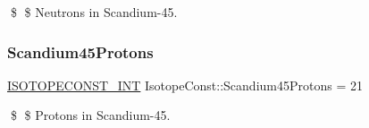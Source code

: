 \$ \$ Neutrons in Scandium-\/45. \mbox{\label{group___isotope_const-_scandium-_sc45_ga2f03bbc348934fbb65cb8064552cea9f}} 
\subsubsection{\texorpdfstring{Scandium45\+Protons}{Scandium45Protons}}
{\footnotesize\ttfamily \mbox{\hyperlink{group___isotope_const-_macros_ga5f18360b3e99483a35c32d789e62621c}{I\+S\+O\+T\+O\+P\+E\+C\+O\+N\+S\+T\+\_\+\+I\+NT}} Isotope\+Const\+::\+Scandium45\+Protons = 21}

\$ \$ Protons in Scandium-\/45. 